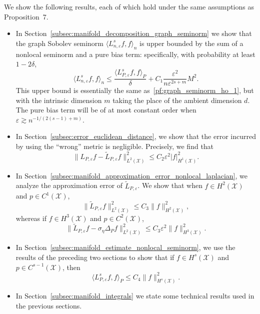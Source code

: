 \documentclass[aos]{imsart}
\theoremstyle{plain}
\theoremstyle{definition}
\theoremstyle{remark}
\newcommand{\dotp}[2]{\langle #1, #2 \rangle}
\newcommand{\wt}[1]{\widetilde{#1}}
\newcommand{\mc}[1]{\mathcal{#1}}
\newcommand{\1}{\mathbf{1}}
\begin{document}
We show the following results, each of which hold under the same assumptions as Proposition~7.
\begin{itemize}
	\item In Section~\ref{subsec:manifold_decomposition_graph_seminorm} we show that the graph Sobolev seminorm $\dotp{L_{n,\varepsilon}^sf}{f}_n$ is upper bounded by the sum of a nonlocal seminorm and a pure bias term: specifically, with probability at least $1 - 2\delta$,
	\begin{equation}
	\label{pf:graph_seminorm_manifold_1}
	\dotp{L_{n,\varepsilon}^sf}{f}_n \leq \frac{\dotp{L_{P,\varepsilon}^sf}{f}_P}{\delta} + C_1\frac{\varepsilon^2}{n\varepsilon^{2s + m}}M^2.
	\end{equation}
	This upper bound is essentially the same as~\eqref{pf:graph_seminorm_ho_1}, but with the intrinsic dimension $m$ taking the place of the ambient dimension $d$. The pure bias term will be of at most constant order when $\varepsilon \gtrsim n^{-1/(2(s-1) + m)}$. 
	\item In Section~\ref{subsec:error_euclidean_distance}, we show that the error incurred by using the ``wrong'' metric is negligible. Precisely, we find that
	\begin{equation}
	\label{eqn:nonlocal_laplacian_geodesic_error}
	\|L_{P,\varepsilon}f - \wt{L}_{P,\varepsilon}f\|_{L^2(\mc{X})}^2 \leq C_2 \varepsilon^2 |f|_{H^1(\mc{X})}^2.
	\end{equation}
	\item In Section~\ref{subsec:manifold_approximation_error_nonlocal_laplacian}, we analyze the approximation error of $\wt{L}_{P,\varepsilon}$. We show that when $f \in H^2(\mc{X})$ and $p \in C^1(\mc{X})$, 
	\begin{equation}
	\label{eqn:nonlocal_laplacian_approximation_error_manifold_l2}
	\|\wt{L}_{P,\varepsilon}f\|_{L^2(\mc{X})}^2 \leq C_3 \|f\|_{H^2(\mc{X})}^2,
	\end{equation}
	whereas if $f \in H^3(\mc{X})$ and $p \in C^2(\mc{X})$, 
	\begin{equation}
	\label{eqn:nonlocal_laplacian_approximation_error_manifold_sobolev}
	\|\wt{L}_{P,\varepsilon}f - \sigma_{\eta}\Delta_Pf\|_{L^2(\mc{X})}^2 \leq C_3 \varepsilon^2 \|f\|_{H^3(\mc{X})}^2.
	\end{equation}
	\item In Section~\ref{subsec:manifold_estimate_nonlocal_seminorm}, we use the results of the preceding two sections to show that if $f \in H^s(\mc{X})$ and $p \in C^{s - 1}(\mc{X})$, then 
	\begin{equation}
	\label{eqn:manifold_nonlocal_seminorm}
	\dotp{L_{P,\varepsilon}^sf}{f}_P \leq C_4\|f\|_{H^s(\mc{X})}^2.
	\end{equation}
	\item In Section~\ref{subsec:manifold_integrals} we state some technical results used in the previous sections.
\end{itemize}
\end{document}
